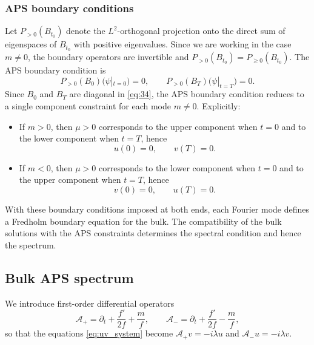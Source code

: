 \documentclass[11pt]{article}
\theoremstyle{definition}
\numberwithin{equation}{section}
\begin{document}
\subsubsection{APS boundary conditions}\label{subsec:aps-bc}
Let \(P_{>0}(B_{t_0})\) denote the \(L^2\)-orthogonal projection onto the direct sum of eigenspaces of \(B_{t_0}\) with positive eigenvalues. Since we are working in the case \(m\neq 0\), the boundary operators are invertible and \(P_{>0}(B_{t_0})=P_{\ge 0}(B_{t_0})\). The APS boundary condition is
\begin{equation}
P_{>0}(B_0)\bigl(\psi|_{t=0}\bigr)=0,\qquad
P_{>0}(B_T)\bigl(\psi|_{t=T}\bigr)=0.
\end{equation}
Since \(B_0\) and \(B_T\) are diagonal in \eqref{eq:34}, the APS boundary condition reduces to a single component constraint for each
mode \(m\neq 0\). Explicitly:
\begin{itemize}
\item If \(m>0\), then \(\mu > 0\) corresponds to the upper component when \(t=0\) and to the lower component when
\(t=T\), hence
\begin{equation}
u(0)=0,\qquad v(T)=0.
\end{equation}
\item If \(m<0\), then \(\mu > 0\) corresponds to the lower component when \(t=0\) and to the upper component when
\(t=T\), hence
\begin{equation}
v(0)=0,\qquad u(T)=0.
\end{equation}
\end{itemize}

With these boundary conditions imposed at both ends, each Fourier mode defines a Fredholm boundary equation for the bulk. The compatibility of the bulk solutions with the APS constraints determines the spectral condition and hence the spectrum.

\subsection{Bulk APS spectrum }\label{subsec:bulk-spectrum}
We introduce first-order differential operators
\begin{equation}
\mathcal{A}_{+} =\partial_t+\frac{f'}{2f}+\frac{m}{f},\qquad
\mathcal{A}_{-} =\partial_t+\frac{f'}{2f}-\frac{m}{f},
\end{equation}
so that the equations \eqref{eq:uv_system} become \(\mathcal{A}_+v=-i\lambda u\) and \(\mathcal{A}_-u=-i\lambda v\).
\end{document}
